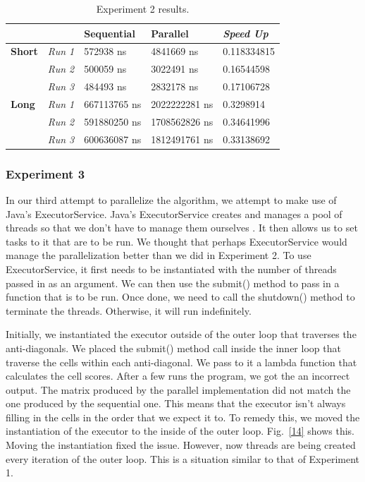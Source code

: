 \documentclass[conference]{IEEEtran}
\begin{document}
\begin{table}[]
\caption{Experiment 2 results.}
\label{tab:table2}
\begin{tabular}{|l|l|l|l|l|}
\hline
               & \textbf{}      & \textbf{Sequential} & \textbf{Parallel} & \textit{\textbf{Speed Up}} \\ \hline
\textbf{Short} & \textit{Run 1} & 572938 ns           & 4841669 ns        & 0.118334815                \\ \hline
               & \textit{Run 2} & 500059 ns           & 3022491 ns        & 0.16544598                 \\ \hline
               & \textit{Run 3} & 484493 ns           & 2832178 ns        & 0.17106728                 \\ \hline
\textbf{Long}  & \textit{Run 1} & 667113765 ns        & 2022222281 ns     & 0.3298914                  \\ \hline
               & \textit{Run 2} & 591880250 ns        & 1708562826 ns     & 0.34641996                 \\ \hline
               & \textit{Run 3} & 600636087 ns        & 1812491761 ns     & 0.33138692                 \\ \hline
\end{tabular}
\end{table}

\subsubsection{Experiment 3}
In our third attempt to parallelize the algorithm, we attempt to make use of Java's ExecutorService. Java's ExecutorService creates and manages a pool of threads so that we don't have to manage them ourselves \cite{baeldung_2021}. It then allows us to set tasks to it that are to be run. We thought that perhaps ExecutorService would manage the parallelization better than we did in Experiment 2. To use ExecutorService, it first needs to be instantiated with the number of threads passed in as an argument. We can then use the submit() method to pass in a function that is to be run. Once done, we need to call the shutdown() method to terminate the threads. Otherwise, it will run indefinitely.

Initially, we instantiated the executor outside of the outer loop that traverses the anti-diagonals. We placed the submit() method call inside the inner loop that traverse the cells within each anti-diagonal. We pass to it a lambda function that calculates the cell scores. After a few runs the program, we got the an incorrect output. The matrix produced by the parallel implementation did not match the one produced by the sequential one. This means that the executor isn't always filling in the cells in the order that we expect it to. To remedy this, we moved the instantiation of the executor to the inside of the outer loop. Fig.~\ref{14} shows this. Moving the instantiation fixed the issue. However, now threads are being created every iteration of the outer loop. This is a situation similar to that of Experiment 1.
\end{document}
